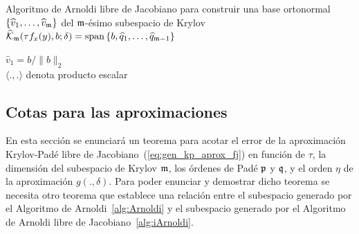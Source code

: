 
{\SetAlgoNoLine
	\begin{algorithm}
		\caption{Algoritmo de Arnoldi libre de Jacobiano para construir una base ortonormal $\{\widehat{v}_1,\ldots,\widehat{v}_{\mathfrak{m}} \}$ 
			del $\mathfrak{m}$-ésimo subespacio de Krylov $\widehat{\mathcal{K}}_{\mathfrak{m}}(\tau f_x(y),b;\delta) = \mathrm{span} \left\{ b,\widehat{q}_1,\ldots,\widehat{q}_{\mathfrak{m}-1} \right\}$}
		\label{alg:iArnoldi}
		$\widehat{v}_1=b/\lVert b \rVert_2$\\
	\nonl $\langle . , .\rangle$ denota producto escalar
	\end{algorithm}
}

 \subsection{Cotas para las aproximaciones}
  En esta sección se enunciará un teorema para acotar el error de la aproximación Krylov-Padé libre de Jacobiano~(\ref{eq:gen_kp_aprox_fj}) en función de $\tau$, la dimensión del subespacio de Krylov $\mathfrak{m}$, los órdenes de Padé $\mathfrak{p}$ y $\mathfrak{q}$, y el orden $\eta$ de la aproximación $g(.,\delta)$. Para poder enunciar  y demostrar dicho teorema se necesita otro teorema que establece una relación entre el subespacio generado por el Algoritmo de Arnoldi~\ref{alg:Arnoldi} y el subespacio generado por el Algoritmo de Arnoldi libre de Jacobiano~\ref{alg:iArnoldi}.

